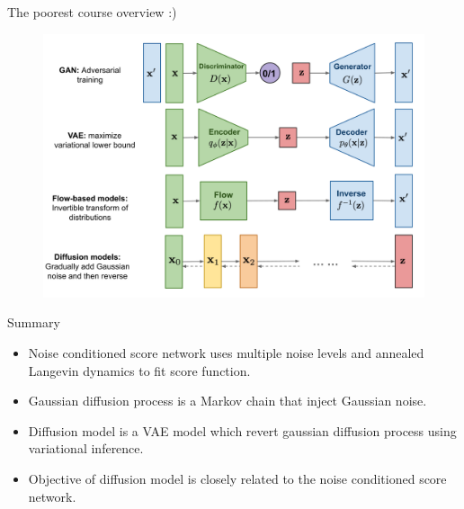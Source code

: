 \begin{frame}{The poorest course overview :)}
	\begin{figure}
		\includegraphics[width=\linewidth]{figs/generative-overview}
	\end{figure}
\end{frame}
\begin{frame}{Summary}
	\begin{itemize}
		\item Noise conditioned score network uses multiple noise levels and annealed Langevin dynamics to fit score function.
		\vfill
		\item Gaussian diffusion process is a Markov chain that inject Gaussian noise.
		\vfill
		\item Diffusion model is a VAE model which revert gaussian diffusion process using variational inference.
		\vfill
		\item Objective of diffusion model is closely related to the noise conditioned score network.
	\end{itemize}
\end{frame}
 